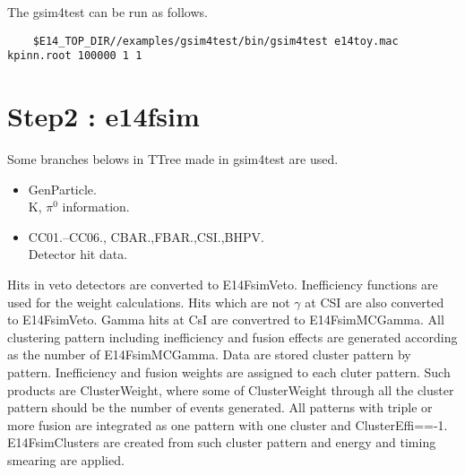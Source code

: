 \documentclass[a4paper,12pt]{article}
\begin{document}
  The gsim4test can be run as follows.
  \begin{verbatim}
	$E14_TOP_DIR//examples/gsim4test/bin/gsim4test e14toy.mac kpinn.root 100000 1 1
  \end{verbatim}
  
  \section{Step2 : e14fsim}
  Some branches belows in TTree made in gsim4test are used.
  \begin{itemize}
   \item GenParticle.\\
	 K, $\pi^0$ information.
   \item CC01.--CC06., CBAR.,FBAR.,CSI.,BHPV.   \\
	 Detector hit data. 
  \end{itemize}

  Hits in veto detectors are converted to E14FsimVeto. Inefficiency
  functions are used for the weight calculations.  
  Hits which are not $\gamma$ at CSI are also converted to E14FsimVeto.
  Gamma hits at CsI are convertred to E14FsimMCGamma.
  All clustering pattern including inefficiency and fusion effects are
  generated according as the number of E14FsimMCGamma. Data are stored
  cluster pattern by pattern. Inefficiency and fusion weights are
  assigned to each cluter pattern. Such products are ClusterWeight,
  where some of ClusterWeight through all the cluster pattern should be
  the number of events generated. All patterns with triple or more
  fusion are integrated as one pattern with one cluster and
  ClusterEffi==-1.  E14FsimClusters are created from such cluster
  pattern and energy and timing smearing are applied.
    
\end{document}
